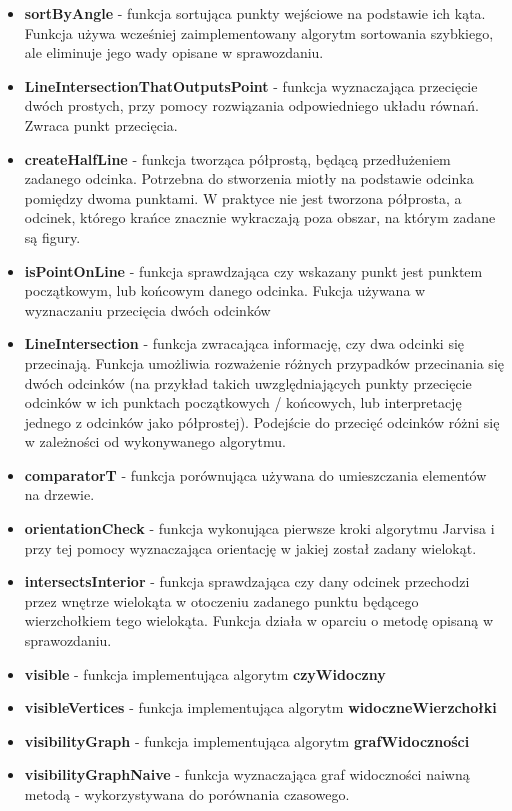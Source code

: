 \documentclass{article}
\begin{document}
\begin{itemize}
\item \textbf{sortByAngle} - funkcja sortująca punkty wejściowe na podstawie ich kąta. Funkcja używa wcześniej zaimplementowany algorytm sortowania szybkiego, ale eliminuje jego wady opisane w sprawozdaniu.

\item \textbf{LineIntersectionThatOutputsPoint} - funkcja wyznaczająca przecięcie dwóch prostych, przy pomocy rozwiązania odpowiedniego układu równań. Zwraca punkt przecięcia.

\item \textbf{createHalfLine} - funkcja tworząca półprostą, będącą przedłużeniem zadanego odcinka. Potrzebna do stworzenia miotły na podstawie odcinka pomiędzy dwoma punktami. W praktyce nie jest tworzona półprosta, a odcinek, którego krańce znacznie wykraczają poza obszar, na którym zadane są figury.

\item \textbf{isPointOnLine} - funkcja sprawdzająca czy wskazany punkt jest punktem początkowym, lub końcowym danego odcinka. Fukcja używana w wyznaczaniu przecięcia dwóch odcinków

\item \textbf{LineIntersection} - funkcja zwracająca informację, czy dwa odcinki się przecinają. Funkcja umożliwia rozważenie różnych przypadków przecinania się dwóch odcinków (na przykład takich uwzględniających punkty przecięcie odcinków w ich punktach początkowych / końcowych, lub interpretację jednego z odcinków jako półprostej). Podejście do przecięć odcinków różni się w zależności od wykonywanego algorytmu.

\item \textbf{comparatorT} - funkcja porównująca używana do umieszczania elementów na drzewie.

\item \textbf{orientationCheck} - funkcja wykonująca pierwsze kroki algorytmu Jarvisa i przy tej pomocy wyznaczająca orientację w jakiej został zadany wielokąt.

\item \textbf{intersectsInterior} - funkcja sprawdzająca czy dany odcinek przechodzi przez wnętrze wielokąta w otoczeniu zadanego punktu będącego wierzchołkiem tego wielokąta. Funkcja działa w oparciu o metodę opisaną w sprawozdaniu.

\item \textbf{visible} - funkcja implementująca algorytm \textbf{czyWidoczny}

\item \textbf{visibleVertices} - funkcja implementująca algorytm \textbf{widoczneWierzchołki}

\item \textbf{visibilityGraph} - funkcja implementująca algorytm \textbf{grafWidoczności}

\item \textbf{visibilityGraphNaive} - funkcja wyznaczająca graf widoczności naiwną metodą - wykorzystywana do porównania czasowego.

\end{itemize}
\end{document}
